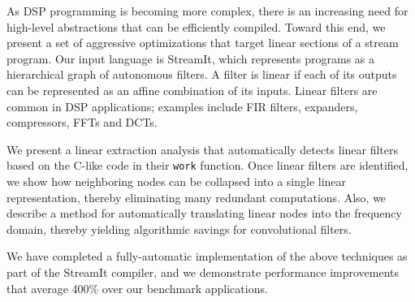 As DSP programming is becoming more complex, there is an increasing
need for high-level abstractions that can be efficiently compiled.
Toward this end, we present a set of aggressive optimizations that
target linear sections of a stream program.  Our input language is
StreamIt, which represents programs as a hierarchical graph of
autonomous filters.  A filter is linear if each of its outputs can be
represented as an affine combination of its inputs.  Linear filters
are common in DSP applications; examples include FIR filters,
expanders, compressors, FFTs and DCTs.

We present a linear extraction analysis that automatically detects
linear filters based on the C-like code in their {\tt work} function.
Once linear filters are identified, we show how neighboring nodes can
be collapsed into a single linear representation, thereby eliminating
many redundant computations.  Also, we describe a method for
automatically translating linear nodes into the frequency domain,
thereby yielding algorithmic savings for convolutional filters.

We have completed a fully-automatic implementation of the above
techniques as part of the StreamIt compiler, and we demonstrate
performance improvements that average 400\% over our benchmark
applications.



